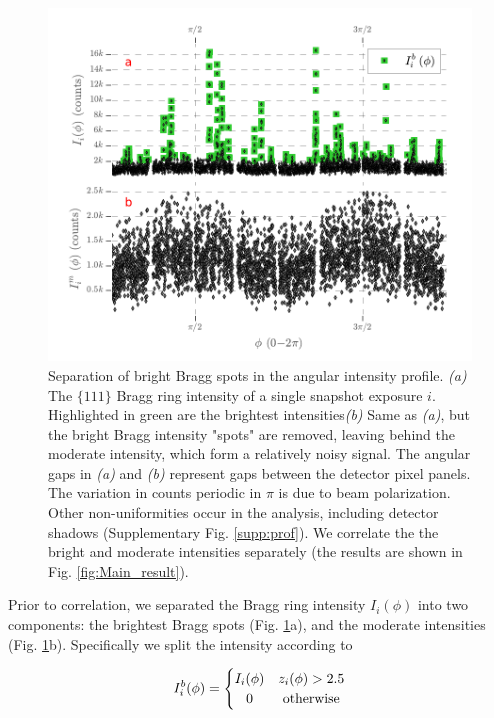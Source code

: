 \documentclass [12pt,fleqn]{article}
\begin{document}
\begin{figure}[H]
\centering
\includegraphics[scale=1]{./Fig3Apr7.pdf}
\caption{Separation of bright Bragg spots in the angular intensity profile. \emph{(a)} The $\{111\}$ Bragg ring intensity of a single snapshot exposure $i$. Highlighted in green are the brightest intensities\emph{(b)} Same as \emph{(a)}, but the bright Bragg intensity "spots" are removed, leaving behind the moderate intensity, which form a relatively noisy signal. The angular gaps in \emph{(a)} and \emph{(b)} represent gaps between the detector pixel panels. The variation in counts periodic in $\pi$ is due to beam polarization. Other non-uniformities occur in the analysis, including detector shadows (Supplementary Fig. \ref{supp:prof}). We correlate the the bright and moderate intensities separately (the results are shown in Fig. \ref{fig:Main_result}).}
\label{fig:peaks_rm}
\end{figure}

Prior to correlation, we separated the Bragg ring intensity $I_i(\phi)$ into two components: the brightest Bragg spots (Fig. \ref{fig:peaks_rm}a), and the moderate intensities (Fig. \ref{fig:peaks_rm}b). Specifically we split the intensity according to  

\[
 I^b_i(\phi) =
  \begin{cases} 
      \hfill I_i(\phi)    \hfill &  z_i(\phi) > 2.5 \\
      \hfill 0 \hfill & \text{ otherwise} \\
  \end{cases}
\]
\end{document}
